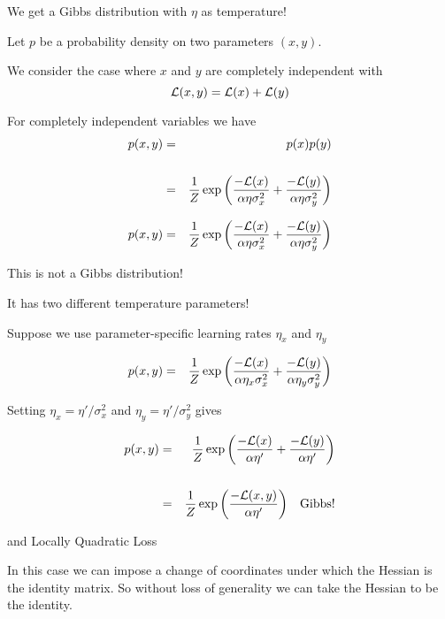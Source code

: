 {\vfill
We get a Gibbs distribution with $\eta$ as temperature!


Let $p$ be a probability density on two parameters $(x,y)$.

\vfill
We consider the case where $x$ and $y$ are completely independent with
$${\cal L}(x,y) = {\cal L}(x) + {\cal L}(y)$$

\vfill
For completely independent variables we have
\begin{eqnarray*}
p(x,y) & = & p(x)p(y) \\
\\
&= & \frac{1}{Z} \exp\left(\frac{-{\cal L}(x)}{\alpha \eta \sigma_x^2} + \frac{-{\cal L}(y)}{\alpha \eta \sigma_y^2}\right)
\end{eqnarray*}


\begin{eqnarray*}
p(x,y) & = & \frac{1}{Z} \exp\left(\frac{-{\cal L}(x)}{\alpha \eta \sigma_x^2} + \frac{-{\cal L}(y)}{\alpha \eta \sigma_y^2}\right)
\end{eqnarray*}

\vfill
This is not a Gibbs distribution!

\vfill
It has two different temperature parameters!


Suppose we use parameter-specific learning rates $\eta_x$ and $\eta_y$

\begin{eqnarray*}
p(x,y) & = & \frac{1}{Z} \exp\left(\frac{-{\cal L}(x)}{\alpha \eta_x \sigma_x^2} + \frac{-{\cal L}(y)}{\alpha \eta_y \sigma_y^2}\right)
\end{eqnarray*}

Setting $\eta_x = \eta'/\sigma^2_x$ and $\eta_y = \eta'/\sigma^2_y$ gives

\begin{eqnarray*}
p(x,y) & = & \frac{1}{Z} \exp\left(\frac{-{\cal L}(x)}{\alpha \eta'} + \frac{-{\cal L}(y)}{\alpha \eta'}\right) \\
\\
& = & \frac{1}{Z} \exp\left(\frac{-{\cal L}(x,y)}{\alpha \eta'}\right)\;\;\;\mathrm{Gibbs!}
\end{eqnarray*}

{and Locally Quadratic Loss}

In this case we can impose a change of coordinates under which the Hessian is the identity matrix.  So without loss of generality we can take the
Hessian to be the identity.

}
